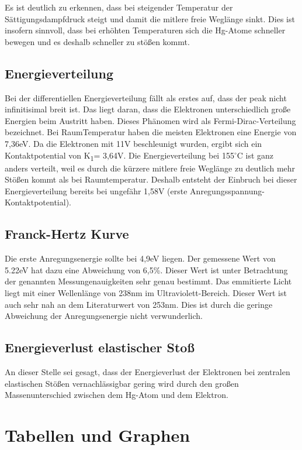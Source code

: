 Es ist deutlich zu erkennen, dass bei steigender Temperatur der Sättigungsdampfdruck steigt und damit die mitlere freie Weglänge sinkt. Dies ist insofern sinnvoll, dass bei erhöhten Temperaturen sich die Hg-Atome schneller bewegen und es deshalb schneller zu stößen kommt.

\subsection{Energieverteilung}

Bei der differentiellen Energieverteilung fällt als erstes auf, dass der peak nicht infinitisimal breit ist. Das liegt daran, dass die Elektronen unterschiedlich große Energien beim Austritt haben. Dieses Phänomen wird als Fermi-Dirac-Verteilung bezeichnet. Bei RaumTemperatur haben die meisten Elektronen eine Energie von 7,36eV. Da die Elektronen mit 11V beschleunigt wurden, ergibt sich ein Kontaktpotential von K\textsubscript{1}= 3,64V. Die Energieverteilung bei 155$^\circ$C ist ganz anders verteilt, weil es durch die kürzere mitlere freie Weglänge zu deutlich mehr Stößen kommt als bei Raumtemperatur. Deshalb entsteht der Einbruch bei dieser Energieverteilung bereits bei ungefähr 1,58V (erste Anregungsspannung-Kontaktpotential).

\subsection{Franck-Hertz Kurve}

Die erste Anregungsenergie sollte bei 4,9eV liegen. Der gemessene Wert von 5.22eV hat dazu eine Abweichung von 6,5\%. Dieser Wert ist unter Betrachtung der genannten Messungenauigkeiten sehr genau bestimmt. 
Das emmitierte Licht liegt mit einer Wellenlänge von 238nm im Ultraviolett-Bereich. Dieser Wert ist auch sehr nah an dem Literaturwert von 253nm. Dies ist durch die geringe Abweichung der Anregungsenergie nicht verwunderlich.

\subsection{Energieverlust elastischer Stoß}
An dieser Stelle sei gesagt, dass der Energieverlust der Elektronen bei zentralen elastischen Stößen vernachlässigbar gering wird durch den großen Massenunterschied zwischen dem Hg-Atom und dem Elektron.

\section{Tabellen und Graphen}

